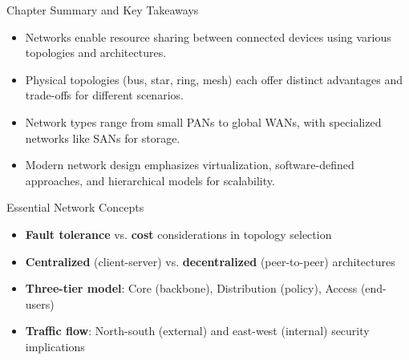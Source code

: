 \documentclass[aspectratio=169]{beamer}
\begin{document}
	\begin{frame}{Chapter Summary and Key Takeaways}
		\begin{itemize}
			\item Networks enable resource sharing between connected devices using various topologies and architectures.
			\item Physical topologies (bus, star, ring, mesh) each offer distinct advantages and trade-offs for different scenarios.
			\item Network types range from small PANs to global WANs, with specialized networks like SANs for storage.
			\item Modern network design emphasizes virtualization, software-defined approaches, and hierarchical models for scalability.
		\end{itemize}
		
		\begin{block}{Essential Network Concepts}
			\begin{itemize}
				\item \textbf{Fault tolerance} vs. \textbf{cost} considerations in topology selection
				\item \textbf{Centralized} (client-server) vs. \textbf{decentralized} (peer-to-peer) architectures
				\item \textbf{Three-tier model}: Core (backbone), Distribution (policy), Access (end-users)
				\item \textbf{Traffic flow}: North-south (external) and east-west (internal) security implications
			\end{itemize}
		\end{block}
	\end{frame}
	
\end{document}
